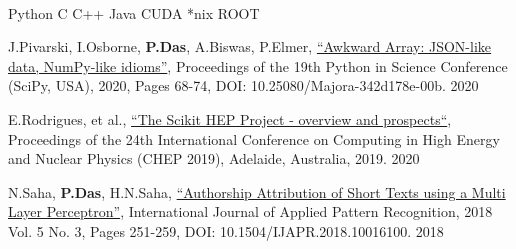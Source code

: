 \documentclass[10pt, letterpaper]{fulldeps}
\begin{document}
\vspace{-10pt}

%
%
\vspace{-5pt}
\\
\vspace{-20pt}

%
%
\vspace{-3pt}
\textbullet{}Python \textbullet{}C \textbullet{}C++ \textbullet{}Java \textbullet{}CUDA \textbullet{}*nix \textbullet{}ROOT
\vspace{-4pt}

%
%
\small{\begin{tightitemize}
    \item J.Pivarski, I.Osborne, {\textbf{P.Das}}, A.Biswas, P.Elmer, {\href{http://conference.scipy.org/proceedings/scipy2020/jim_pivarski.html}{``Awkward Array: JSON-like data, NumPy-like idioms''}}, Proceedings of the 19th Python in Science Conference (SciPy, USA), 2020, Pages 68-74, DOI: 10.25080/Majora-342d178e-00b. \hfill{2020}
    \item E.Rodrigues, et al., {\href{https://arxiv.org/abs/2007.03577}{``The Scikit HEP Project - overview and prospects``}}, Proceedings of the 24th International Conference on Computing in High Energy and Nuclear Physics (CHEP 2019), Adelaide, Australia, 2019. \hfill{2020}
    \item N.Saha, {\textbf{P.Das}}, H.N.Saha, {\href{https://www.inderscienceonline.com/doi/abs/10.1504/IJAPR.2018.094819}{``Authorship Attribution of Short Texts using a Multi Layer Perceptron''}}, International Journal of Applied Pattern Recognition, 2018 Vol. 5 No. 3, Pages 251-259, DOI: 10.1504/IJAPR.2018.10016100. \hfill{2018}
\end{tightitemize}}
\end{document}
